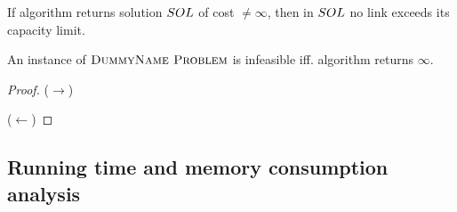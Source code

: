 \begin{lemma}
  If algorithm returns solution $SOL$ of cost $\neq \infty$, then in $SOL$ no link exceeds its capacity limit.
  \end{lemma}

\begin{lemma}
An instance of $\textsc{DummyName Problem}$ is infeasible iff. algorithm returns $\infty$.
\end{lemma}
\begin{proof}
  ($\rightarrow$)

  ($\leftarrow$)
  \end{proof}


\subsection{Running time and memory consumption analysis}
